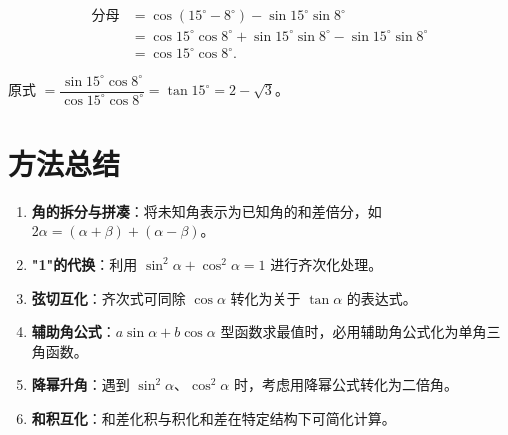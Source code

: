 \documentclass[11pt]{ctexrep}
\begin{document}
\begin{align*}
    \text{分母} &= \cos(15^{\circ} - 8^{\circ}) - \sin 15^{\circ}\sin 8^{\circ} \\
    &= \cos 15^{\circ}\cos 8^{\circ} + \sin 15^{\circ}\sin 8^{\circ} - \sin 15^{\circ}\sin 8^{\circ} \\
    &= \cos 15^{\circ}\cos 8^{\circ}.
\end{align*}

原式 $= \dfrac{\sin 15^{\circ}\cos 8^{\circ}}{\cos 15^{\circ}\cos 8^{\circ}} = \tan 15^{\circ} = 2 - \sqrt{3}$。

\section*{方法总结}

\begin{enumerate}
    \item \textbf{角的拆分与拼凑}：将未知角表示为已知角的和差倍分，如 $2\alpha = (\alpha + \beta) + (\alpha - \beta)$。
    \item \textbf{"1"的代换}：利用 $\sin^2\alpha + \cos^2\alpha = 1$ 进行齐次化处理。
    \item \textbf{弦切互化}：齐次式可同除 $\cos\alpha$ 转化为关于 $\tan\alpha$ 的表达式。
    \item \textbf{辅助角公式}：$a\sin\alpha + b\cos\alpha$ 型函数求最值时，必用辅助角公式化为单角三角函数。
    \item \textbf{降幂升角}：遇到 $\sin^2\alpha$、$\cos^2\alpha$ 时，考虑用降幂公式转化为二倍角。
    \item \textbf{和积互化}：和差化积与积化和差在特定结构下可简化计算。
\end{enumerate}
\end{document}
